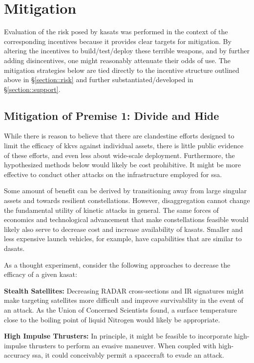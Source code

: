 \section{Mitigation}

Evaluation of the risk posed by \acp{kasat} was performed in the
context of the corresponding incentives because it provides clear
targets for mitigation.  By altering the incentives to
build/test/deploy these terrible weapons, and by further adding
disincentives, one might reasonably attenuate their odds of use.  The
mitigation strategies below are tied directly to the incentive
structure outlined above in \S\ref{section::risk} and further
substantiated/developed in \S\ref{section::support}.

\subsection{Mitigation of Premise 1: Divide and Hide}
\label{section::mitigation::1}

While there is reason to believe that there are clandestine efforts
designed to limit the efficacy of \acp{kkv} against individual assets,
there is little public evidence of these efforts, and even less about
wide-scale deployment.  Furthermore, the hypothesized methods below
would likely be cost prohibitive.  It might be more effective to
conduct other attacks on the infrastructure employed for \acf{ssa}.

Some amount of benefit can be derived by transitioning away from large
singular assets and towards resilient constellations.  However,
disaggregation cannot change the fundamental utility of kinetic
attacks in general.  The same forces of economics and technological
advancement that make constellations feasible would likely also serve
to decrease cost and increase availability of \acp{kasat}.  Smaller
and less expensive launch vehicles, for example, have capabilities
that are similar to \acp{dasat}.

As a thought experiment, consider the following approaches to decrease
the efficacy of a given \ac{kasat}:

\textbf{Stealth Satellites:} Decreasing RADAR cross-sections and IR
signatures might make targeting satellites more difficult and improve
survivability in the event of an attack.  As the Union of Concerned
Scientists found, a surface temperature close to the boiling point of
liquid Nitrogen would likely be appropriate.\cite[p48]{abm-me-not}

\textbf{High Impulse Thrusters:} In principle, it might be feasible to
incorporate high-impulse thrusters to perform an evasive maneuver.
When coupled with high-accuracy \ac{ssa}, it could conceivably permit
a spacecraft to evade an attack.

